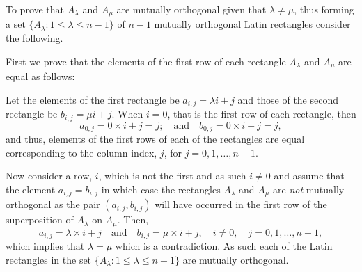To prove that $A_\lambda$ and $A_\mu$ are mutually orthogonal given that $\lambda \not= \mu$, thus forming a set $\{A_\lambda: 1\leq \lambda \leq n-1\}$ of $n-1$ mutually orthogonal Latin rectangles consider the following.

First we prove that  the elements of the first row of each rectangle $A_\lambda$ and $A_\mu$ are equal as follows:

Let the elements of the first rectangle be $a_{i,j} = \lambda i + j$ and those of the second rectangle be $b_{i,j} = \mu i +j$. When $i=0$, that is the first row of each rectangle, then
\[
	a_{0,j} = 0\times i + j = j; \quad \text{and}\quad b_{0,j} =  0\times i + j = j,
\]
and thus, elements of the first rows of each of the rectangles are equal corresponding to the column index, $j$, for $j = 0,1,\ldots,n-1$. 

Now consider a row, $i$, which is not the first and as such $i \not=0$ and assume that the element $a_{i,j}=b_{i,j}$ in which case the rectangles $A_\lambda$ and $A_\mu$ are \textit{not} mutually orthogonal as the pair $(a_{i,j}, b_{i,j})$ will have occurred in the first row of the superposition of $A_\lambda$ on $A_\mu$. Then,
\[
	a_{i,j} = \lambda\times i + j \quad \text{and}\quad b_{i,j} =  \mu\times i + j,\quad i\not= 0,\quad j=0,1,\ldots,n-1,
\]
which implies that $\lambda = \mu$ which is a contradiction. As such each of the Latin rectangles in the set $\{A_\lambda: 1\leq \lambda \leq n-1\}$ are mutually orthogonal. 